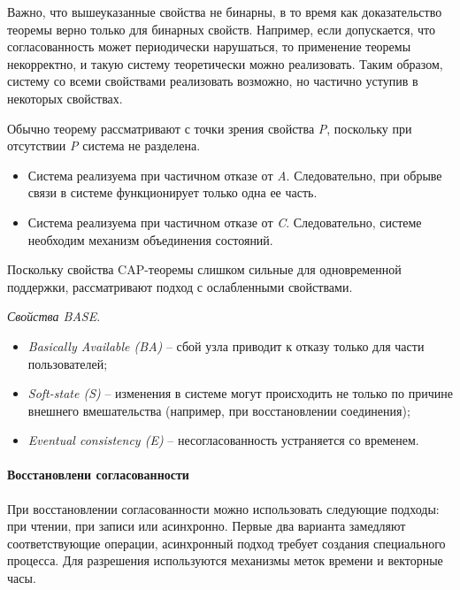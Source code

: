 \begin{remark}
	Важно, что вышеуказанные свойства не бинарны, в то время как доказательство теоремы верно только
	для бинарных свойств. Например, если допускается, что согласованность может периодически
	нарушаться, то применение теоремы некорректно, и такую систему теоретически можно реализовать.
	Таким образом, систему со всеми свойствами реализовать возможно, но частично уступив в некоторых
	свойствах.
\end{remark}

Обычно теорему рассматривают с точки зрения свойства \textit{P}, поскольку при
отсутствии \textit{P} система не разделена.

\begin{itemize}
	\item Система реализуема при частичном отказе от \textit{A}. Следовательно, при обрыве связи
	      в системе функционирует только одна ее часть.
	\item Система реализуема при частичном отказе от \textit{C}. Следовательно, системе необходим
	      механизм объединения состояний.
\end{itemize}

Поскольку свойства CAP-теоремы слишком сильные для одновременной поддержки, рассматривают подход с
ослабленными свойствами.

\begin{definition}
	\textit{Свойства BASE}.
	\begin{itemize}
		\item \textit{Basically Available (BA)} -- сбой узла приводит к отказу только для части
		      пользователей;
		\item \textit{Soft-state (S)} -- изменения в системе могут происходить не только по причине
		      внешнего вмешательства (например, при восстановлении соединения);
		\item \textit{Eventual consistency (E)} -- несогласованность устраняется со временем.
	\end{itemize}
\end{definition}

\paragraph{Восстановлени согласованности}

При восстановлении согласованности можно использовать следующие подходы: при чтении, при записи или
асинхронно. Первые два варианта замедляют соответствующие операции, асинхронный подход требует
создания специального процесса. Для разрешения используются механизмы меток времени и векторные
часы.

